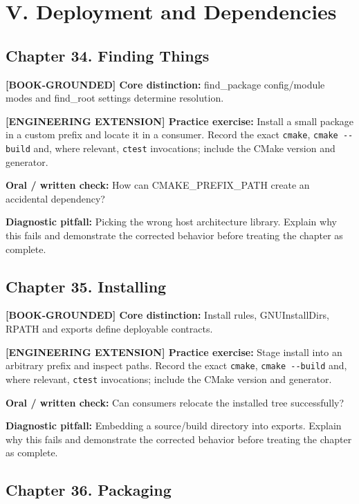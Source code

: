 \documentclass[11pt,letterpaper,oneside]{report}
\providecommand{\passthrough}[1]{#1}
\begin{document}
\chapter{V. Deployment and
Dependencies}\label{v.-deployment-and-dependencies}

\section{Chapter 34. Finding Things}\label{chapter-34.-finding-things}

\textbf{{[}BOOK-GROUNDED{]} Core distinction:} find\_package
config/module modes and find\_root settings determine resolution.

\textbf{{[}ENGINEERING EXTENSION{]} Practice exercise:} Install a small
package in a custom prefix and locate it in a consumer. Record the exact
\passthrough{\lstinline!cmake!}, \passthrough{\lstinline!cmake --build!}
and, where relevant, \passthrough{\lstinline!ctest!} invocations;
include the CMake version and generator.

\textbf{Oral / written check:} How can CMAKE\_PREFIX\_PATH create an
accidental dependency?

\textbf{Diagnostic pitfall:} Picking the wrong host architecture
library. Explain why this fails and demonstrate the corrected behavior
before treating the chapter as complete.

\section{Chapter 35. Installing}\label{chapter-35.-installing}

\textbf{{[}BOOK-GROUNDED{]} Core distinction:} Install rules,
GNUInstallDirs, RPATH and exports define deployable contracts.

\textbf{{[}ENGINEERING EXTENSION{]} Practice exercise:} Stage install
into an arbitrary prefix and inspect paths. Record the exact
\passthrough{\lstinline!cmake!}, \passthrough{\lstinline!cmake --build!}
and, where relevant, \passthrough{\lstinline!ctest!} invocations;
include the CMake version and generator.

\textbf{Oral / written check:} Can consumers relocate the installed tree
successfully?

\textbf{Diagnostic pitfall:} Embedding a source/build directory into
exports. Explain why this fails and demonstrate the corrected behavior
before treating the chapter as complete.

\section{Chapter 36. Packaging}\label{chapter-36.-packaging}
\end{document}
